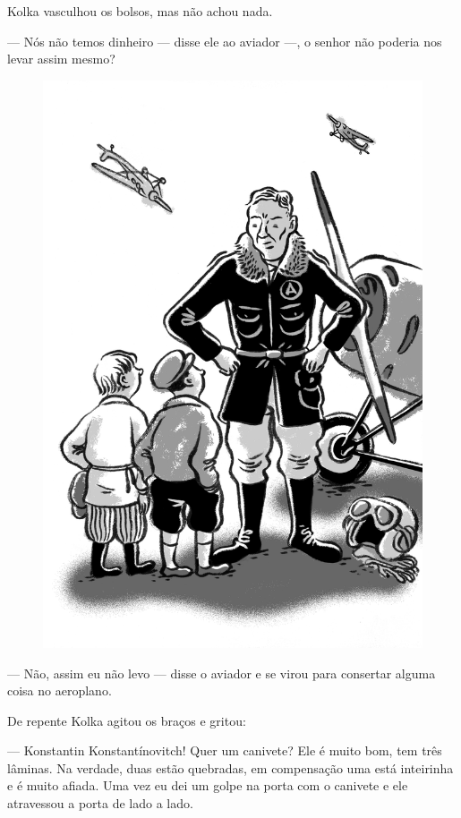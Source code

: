 Kolka vasculhou os bolsos, mas não achou nada.

--- Nós não temos dinheiro --- disse ele ao aviador ---, o senhor não
poderia nos levar assim mesmo?

\begin{figure}%
\vspace*{-1.6cm}
\hspace*{-2.4cm}\includegraphics{./imgs/cena15.jpg}
\end{figure}

--- Não, assim eu não levo --- disse o aviador e se virou para
consertar alguma coisa no aeroplano.

De repente Kolka agitou os braços e gritou:

--- Konstantin Konstantínovitch! Quer um canivete? Ele é muito bom, tem
três lâminas. Na verdade, duas estão quebradas, em compensação uma está
inteirinha e é muito afiada. Uma vez eu dei um golpe na porta com o
canivete e ele atravessou a porta de lado a lado.

